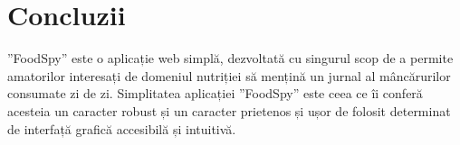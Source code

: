 
\section{Concluzii}
”FoodSpy” este o aplicație web simplă, dezvoltată cu singurul scop de a permite amatorilor interesați de domeniul nutriției să mențină un jurnal al mâncărurilor consumate zi de zi. Simplitatea aplicației ”FoodSpy” este ceea ce îi conferă acesteia un caracter robust și un caracter prietenos și ușor de folosit determinat de interfață grafică accesibilă și intuitivă.

